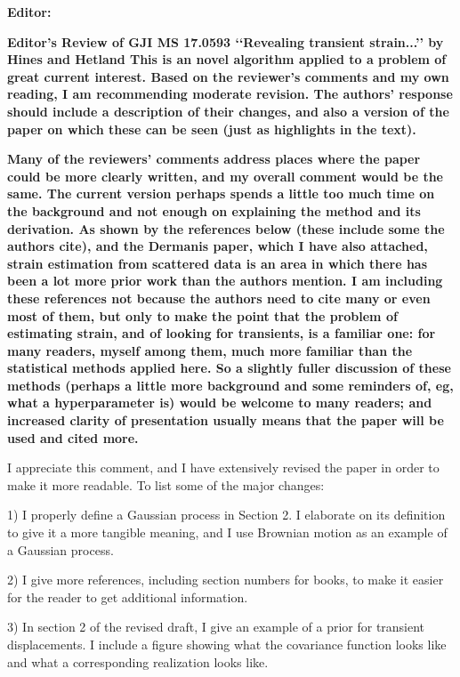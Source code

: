 \documentclass[10pt,a4paper]{letter}
\begin{document}
\begin{letter}{}

\textbf{Editor:}\newline

\textbf{Editor’s Review of GJI MS 17.0593 ‘‘Revealing transient
strain...’’ by Hines and Hetland This is an novel algorithm applied to
a problem of great current interest. Based on the reviewer’s comments
and my own reading, I am recommending moderate revision. The authors’
response should include a description of their changes, and also a
version of the paper on which these can be seen (just as highlights in
the text).}

\textbf{Many of the reviewers’ comments address places where the paper
could be more clearly written, and my overall comment would be the
same. The current version perhaps spends a little too much time on the
background and not enough on explaining the method and its derivation.
As shown by the references below (these include some the authors
cite), and the Dermanis paper, which I have also attached, strain
estimation from scattered data is an area in which there has been a
lot more prior work than the authors mention. I am including these
references not because the authors need to cite many or even most of
them, but only to make the point that the problem of estimating
strain, and of looking for transients, is a familiar one: for many
readers, myself among them, much more familiar than the statistical
methods applied here. So a slightly fuller discussion of these methods
(perhaps a little more background and some reminders of, eg, what a
hyperparameter is) would be welcome to many readers; and increased
clarity of presentation usually means that the paper will be used
and cited more.}

I appreciate this comment, and I have extensively revised the paper in
order to make it more readable. To list some of the major changes:

  1) I properly define a Gaussian process in Section 2. I elaborate on
     its definition to give it a more tangible meaning, and I use
     Brownian motion as an example of a Gaussian process.

  2) I give more references, including section numbers for books, to
     make it easier for the reader to get additional information.
   
  3) In section 2 of the revised draft, I give an example of a prior
     for transient displacements. I include a figure showing what the
     covariance function looks like and what a corresponding
     realization looks like.
  

\end{letter}
\end{document}
